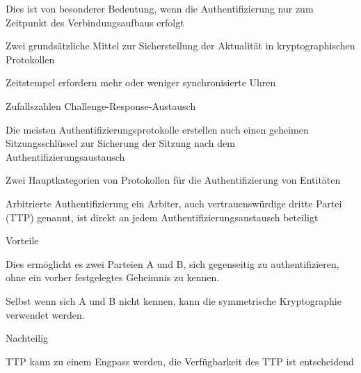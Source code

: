 \documentclass[a4paper]{article}
\begin{document}
\begin{multicols}{3}
\begin{itemize*}
\begin{itemize*}
                  \item Dies ist von besonderer Bedeutung, wenn die Authentifizierung nur zum Zeitpunkt des Verbindungsaufbaus erfolgt
                  \item Zwei grundsätzliche Mittel zur Sicherstellung der Aktualität in kryptographischen Protokollen
                  \begin{description*}
                        \item[Zeitstempel] erfordern mehr oder weniger synchronisierte Uhren
                        \item[Zufallszahlen] Challenge-Response-Austausch
                  \end{description*}
            \end{itemize*}
            \item Die meisten Authentifizierungsprotokolle erstellen auch einen geheimen Sitzungsschlüssel zur Sicherung der Sitzung nach dem Authentifizierungsaustausch
            \item Zwei Hauptkategorien von Protokollen für die Authentifizierung von Entitäten
            \begin{description*}
                  \item[Arbitrierte Authentifizierung] ein Arbiter, auch vertrauenswürdige dritte Partei (TTP) genannt, ist direkt an jedem Authentifizierungsaustausch beteiligt
                  \begin{itemize*}
                        \item Vorteile
                        \begin{itemize*}
                              \item Dies ermöglicht es zwei Parteien A und B, sich gegenseitig zu authentifizieren, ohne ein vorher festgelegtes Geheimnis zu kennen.
                              \item Selbst wenn sich A und B nicht kennen, kann die symmetrische Kryptographie verwendet werden.
                        \end{itemize*}
                        \item Nachteilig
                        \begin{itemize*}
                              \item TTP kann zu einem Engpass werden, die Verfügbarkeit des TTP ist entscheidend

\end{itemize*}
\end{itemize*}
\end{description*}
\end{itemize*}
\end{multicols}
\end{document}
